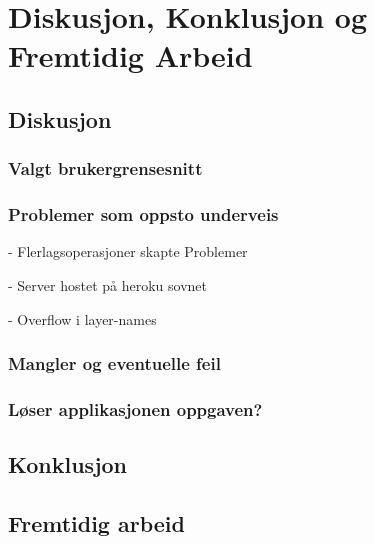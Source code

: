 \chapter{Diskusjon, Konklusjon og Fremtidig Arbeid}

\section{Diskusjon}

\subsection{Valgt brukergrensesnitt}

\subsection{Problemer som oppsto underveis}

- Flerlagsoperasjoner skapte Problemer

- Server hostet på heroku sovnet

- Overflow i layer-names

\subsection{Mangler og eventuelle feil}

\subsection{Løser applikasjonen oppgaven?}

\section{Konklusjon}

\section{Fremtidig arbeid}
